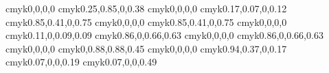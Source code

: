 \definecolor{dem@bg@color}				{cmyk}{0,0,0,0}
\definecolor{activitytitle@color}		{cmyk}{0.25,0.85,0,0.38}
\definecolor{activitynum@color}		 	{cmyk}{0,0,0,0}
\definecolor{exercices@bg@color}		 	{cmyk}{0.17,0.07,0,0.12}
\definecolor{exercicetitle@bg@color}		{cmyk}{0.85,0.41,0,0.75}
\definecolor{exercicetitle@color}		{cmyk}{0,0,0,0}
\definecolor{exercicenum@bg@color}		{cmyk}{0.85,0.41,0,0.75}
\definecolor{exercicenum@color}			{cmyk}{0,0,0,0}
\definecolor{corriges@bg@color}		 	{cmyk}{0.11,0,0.09,0.09}
\definecolor{corrigetitle@bg@color}		{cmyk}{0.86,0,0.66,0.63}
\definecolor{corrigetitle@color}			{cmyk}{0,0,0,0}
\definecolor{corrigenum@bg@color}		{cmyk}{0.86,0,0.66,0.63}
\definecolor{corrigenum@color}			{cmyk}{0,0,0,0}
\definecolor{corref@color}				{cmyk}{0,0.88,0.88,0.45}
\definecolor{indextitle@color}			{cmyk}{0,0,0,0}
\definecolor{indextitle@bg@color}		{cmyk}{0.94,0.37,0,0.17}
\definecolor{contentstitle@color}		{cmyk}{0.07,0,0,0.19}
\definecolor{contentstitleshadow@color}	{cmyk}{0.07,0,0,0.49}


\newcommand{\redefineColor}[2]{\definecolor{#1}{cmyk}{#2}}
\newcommand{\firstline}{\rowcolor{cell@color}}
